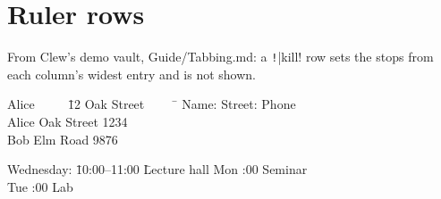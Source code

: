 \section{Ruler rows}

From Clew's demo vault, Guide/Tabbing.md: a \texttt!|kill! row sets the stops from
each column's widest entry and is not shown.

\begin{tabbing}
Alice $\qquad$  \= 12 Oak Street $\qquad$  \= \kill
Name: \> Street: \> Phone \\
Alice  Oak Street  1234 \\
Bob  Elm Road  9876
\end{tabbing}

\begin{tabbing}
Wednesday:  \= 10:00–11:00  \= Lecture hall \kill
Mon :00 \> Seminar \\
Tue :00 \> Lab
\end{tabbing}

